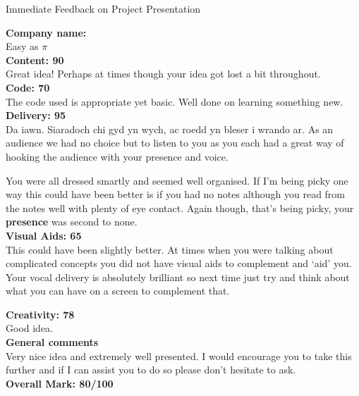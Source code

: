 \documentclass{article}
\begin{document}
\begin{center}
\Huge{Immediate Feedback on Project Presentation}\\
\end{center}


\normalsize
\textbf{Company name:}\\

Easy as $\pi$ \\

\textbf{Content: 90}\\

Great idea!
Perhaps at times though your idea got lost a bit throughout.\\

\textbf{Code: 70}\\

The code used is appropriate yet basic.
Well done on learning something new.\\

\textbf{Delivery: 95}\\

Da iawn.
Siaradoch chi gyd yn wych, ac roedd yn bleser i wrando ar.
As an audience we had no choice but to listen to you as you each had a great way of hooking the audience with your presence and voice.

You were all dressed smartly and seemed well organised.
If I'm being picky one way this could have been better is if you had no notes although you read from the notes well with plenty of eye contact.
Again though, that's being picky, your \textbf{presence} was second to none.\\

\textbf{Visual Aids: 65}\\

This could have been slightly better.
At times when you were talking about complicated concepts you did not have visual aids to complement and `aid' you.
Your vocal delivery is absolutely brilliant so next time just try and think about what you can have on a screen to complement that.

\textbf{Creativity: 78}\\

Good idea.\\


\textbf{General comments}\\

Very nice idea and extremely well presented.
I would encourage you to take this further and if I can assist you to do so please don't hesitate to ask.\\

\textbf{Overall Mark: 80/100}
\end{document}
